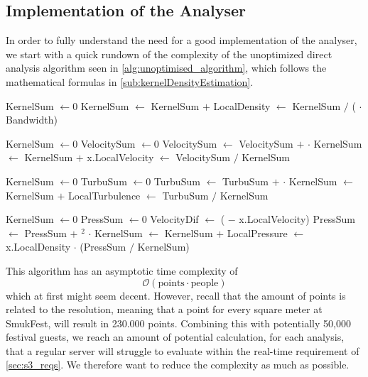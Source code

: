 \subsection{Implementation of the Analyser}\label{sec:kernelDensityEstimation}

In order to fully understand the need for a good implementation of the analyser, we start with a quick rundown of the complexity of the unoptimized direct analysis algorithm seen in \cref{alg:unoptimised_algorithm}, which follows the mathematical formulas in \cref{sub:kernelDensityEstimation}.

\begin{center}
\label{alg:unoptimised_algorithm}
\begin{algorithmic}[1]

    \State KernelSum $\gets 0$
        \State KernelSum $\gets$ KernelSum $+$ 
    \EndFor
    \State LocalDensity $\gets$ KernelSum $/$ ( $\cdot$ Bandwidth)
\EndFor

    \State KernelSum $\gets 0$
    \State VelocitySum $\gets 0$
        \State VelocitySum $\gets$ VelocitySum $+$  $\cdot$ 
        \State KernelSum $\gets$ KernelSum $+$ 
    \EndFor
    \State x.LocalVelocity $\gets$ VelocitySum $/$ KernelSum
\EndFor

    \State KernelSum $\gets 0$
    \State TurbuSum $\gets 0$
        \State TurbuSum $\gets$ TurbuSum $+$  $\cdot$ 
        \State KernelSum $\gets$ KernelSum $+$ 
    \EndFor
    \State LocalTurbulence $\gets$ TurbuSum $/$ KernelSum
\EndFor

    \State KernelSum $\gets 0$
    \State PressSum $\gets 0$
        \State VelocityDif $\gets$ ( $-$ x.LocalVelocity)
        \State PressSum $\gets$ PressSum $+$ $^2$ $\cdot$ 
        \State KernelSum $\gets$ KernelSum $+$ 
    \EndFor
    \State LocalPressure $\gets$ x.LocalDensity $\cdot$ (PressSum $/$ KernelSum)
\EndFor
\EndFunction
\end{algorithmic}
\end{center}

This algorithm has an asymptotic time complexity of $$\mathcal{O}(\text{points} \cdot \text{people})$$ which at first might seem decent. However, recall that the amount of points is related to the resolution, meaning that a point for every square meter at SmukFest, will result in 230.000 points\cite{smukFacts}. Combining this with potentially 50,000 festival guests\cite{smukFacts}, we reach an amount of potential calculation, for each analysis, that a regular server will struggle to evaluate within the real-time requirement of \cref{sec:s3_reqs}. We therefore want to reduce the complexity as much as possible.



